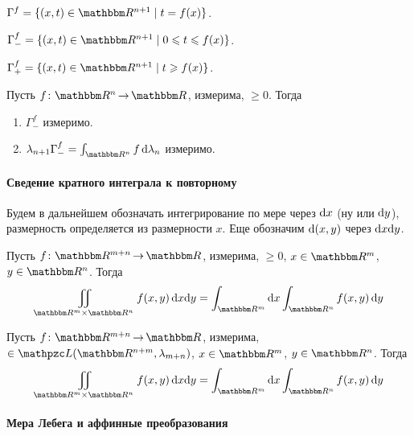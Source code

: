 \documentclass[12pt, timbord]{longnotes}
\begin{document}
\begin{defn}[График]\label{defn:meas::almev::plot}
  $\Gamma^f = \{ (x,t) \in \R^{n+1} \mid t = f(x)\}$.
\end{defn}
\begin{defn}[Подграфик]\label{defn:meas::almev::subplot}
  $\Gamma_-^f = \{ (x,t) \in \R^{n+1} \mid 0 \leqslant t \leqslant f(x)\}$.
\end{defn}
\begin{defn}[Надграфик]\label{defn:meas::almev::supplot}
  $\Gamma_+^f = \{ (x,t) \in \R^{n+1} \mid t \geqslant f(x)\}$.
\end{defn}

\begin{thrm}\label{thrm:meas::almev::geomsense}
  Пусть $f\colon \R^n \to \R$, измерима, $ \geqslant 0$. Тогда
  \begin{enumerate}
    \item $\Gamma_-^f$ измеримо.
    \item $\lambda_{n+1}\Gamma_-^f = \int_{\R^n} f\, \del \lambda_n$ измеримо.
  \end{enumerate}
\end{thrm}

\paragraph{Сведение кратного интеграла к повторному}
\label{par:meas::mult}

Будем в дальнейшем обозначать интегрирование по мере через $\mathrm{d} x$ (ну или
$\mathrm{d} y$), размерность определяется из размерности $x$. Еще обозначим $\mathrm{d} (x,y)$ через
$\mathrm{d} x\mathrm{d} y$. 

\begin{thrm}[Тонелли]\label{thrm:meas::mult::tonn}
  Пусть $f\colon \R^{m+n} \to \R$, измерима, $ \geqslant 0$, $x\in \R^m$, $y \in \R^n$.
  Тогда
  \[
    \iint_{\R^m \times \R^n} f(x,y) \, \del x\del y 
    = \int_{\R^m} \del x \int_{\R^n} f(x,y) \, \del y
  \]
\end{thrm}

\begin{thrm}[Фубини]\label{thrm:meas::mult::fub}
  Пусть $f\colon \R^{m+n} \to \R$, измерима, $\in \summb(\R^{n+m}, \lambda_{m+n})$,
  $x\in \R^m$, $y \in \R^n$. Тогда
  \[
    \iint_{\R^m \times \R^n} f(x,y) \, \del x\del y 
    = \int_{\R^m} \del x \int_{\R^n} f(x,y) \, \del y
  \]
\end{thrm}

\paragraph{Мера Лебега и аффинные преобразования}
\label{par:meas::aff}
\end{document}
